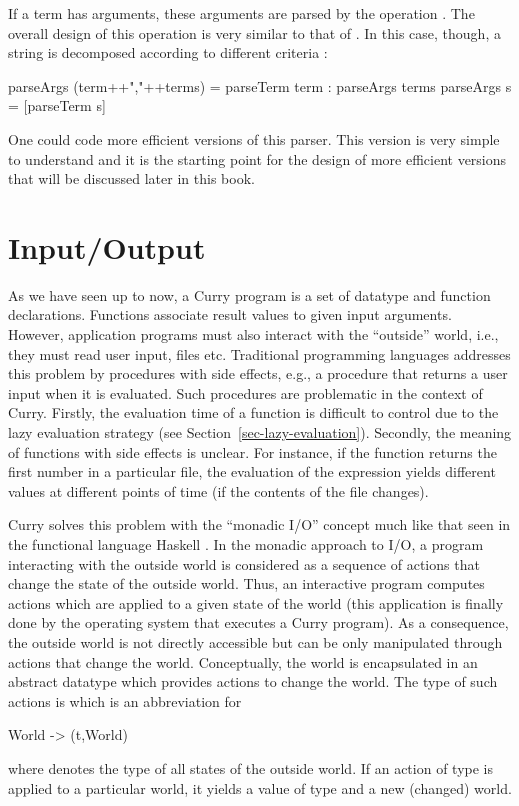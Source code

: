 If a term has arguments, these arguments are parsed by the operation
.
The overall design of this operation is very similar to that
of .
In this case, though, a string is decomposed according to
different criteria
:
%
\begin{prog}
parseArgs (term++","++terms) = parseTerm term : parseArgs terms
parseArgs s = [parseTerm s]
\end{prog}
%
One could code more efficient versions of this parser.
This version is very simple to understand and it is the
starting point for the design of more efficient versions that will be
discussed later in this book.


\section{Input/Output}
\label{sec-io}

As we have seen up to now, a Curry program is a set of datatype
and function declarations. Functions associate result values
to given input arguments. However, application programs must
also interact with the ``outside'' world, i.e., they
must read user input, files etc.
Traditional programming languages addresses this problem
by procedures with side effects, e.g., a procedure 
that returns a user input when it is evaluated.
Such procedures are problematic in the context of Curry.
Firstly, the evaluation time of a function is difficult
to control due to the lazy evaluation strategy
(see Section~\ref{sec-lazy-evaluation}). Secondly,
the meaning of functions with side effects is unclear.
For instance, if the function  returns
the first number in a particular file, the evaluation
of the expression  yields different values
at different points of time (if the contents of the file changes).

Curry solves this problem with the ``monadic I/O'' concept
 much like that seen in the functional language
Haskell \cite{Wadler97}.
In the monadic approach to I/O, a program interacting with
the outside world is considered as a sequence of actions that
change the state of the outside world. Thus, an interactive program
computes actions which are applied to a given state of the world
(this application is finally done by the operating system
that executes a Curry program).
As a consequence, the outside world is not directly
accessible but can be only manipulated through actions that change the world.
Conceptually, the world is encapsulated in an abstract datatype
which provides actions to change the world.
The type of such actions is 
which is an abbreviation for
\begin{prog}
World -> (t,World)
\end{prog}
where  denotes the type of all states of the outside world.
If an action of type  is applied to a particular world,
it yields a value of type  and a new (changed) world.

